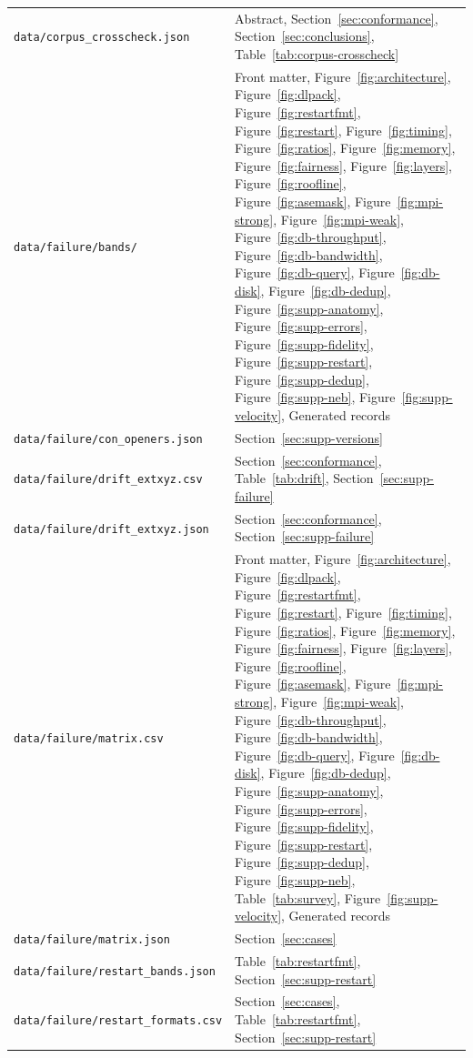 \begin{longtable}{@{}p{}p{}@{}}
\nolinkurl{data/corpus_crosscheck.json} & Abstract, Section~\ref{sec:conformance}, Section~\ref{sec:conclusions}, Table~\ref{tab:corpus-crosscheck} \\
\nolinkurl{data/failure/bands/} & Front matter, Figure~\ref{fig:architecture}, Figure~\ref{fig:dlpack}, Figure~\ref{fig:restartfmt}, Figure~\ref{fig:restart}, Figure~\ref{fig:timing}, Figure~\ref{fig:ratios}, Figure~\ref{fig:memory}, Figure~\ref{fig:fairness}, Figure~\ref{fig:layers}, Figure~\ref{fig:roofline}, Figure~\ref{fig:asemask}, Figure~\ref{fig:mpi-strong}, Figure~\ref{fig:mpi-weak}, Figure~\ref{fig:db-throughput}, Figure~\ref{fig:db-bandwidth}, Figure~\ref{fig:db-query}, Figure~\ref{fig:db-disk}, Figure~\ref{fig:db-dedup}, Figure~\ref{fig:supp-anatomy}, Figure~\ref{fig:supp-errors}, Figure~\ref{fig:supp-fidelity}, Figure~\ref{fig:supp-restart}, Figure~\ref{fig:supp-dedup}, Figure~\ref{fig:supp-neb}, Figure~\ref{fig:supp-velocity}, Generated records \\
\nolinkurl{data/failure/con_openers.json} & Section~\ref{sec:supp-versions} \\
\nolinkurl{data/failure/drift_extxyz.csv} & Section~\ref{sec:conformance}, Table~\ref{tab:drift}, Section~\ref{sec:supp-failure} \\
\nolinkurl{data/failure/drift_extxyz.json} & Section~\ref{sec:conformance}, Section~\ref{sec:supp-failure} \\
\nolinkurl{data/failure/matrix.csv} & Front matter, Figure~\ref{fig:architecture}, Figure~\ref{fig:dlpack}, Figure~\ref{fig:restartfmt}, Figure~\ref{fig:restart}, Figure~\ref{fig:timing}, Figure~\ref{fig:ratios}, Figure~\ref{fig:memory}, Figure~\ref{fig:fairness}, Figure~\ref{fig:layers}, Figure~\ref{fig:roofline}, Figure~\ref{fig:asemask}, Figure~\ref{fig:mpi-strong}, Figure~\ref{fig:mpi-weak}, Figure~\ref{fig:db-throughput}, Figure~\ref{fig:db-bandwidth}, Figure~\ref{fig:db-query}, Figure~\ref{fig:db-disk}, Figure~\ref{fig:db-dedup}, Figure~\ref{fig:supp-anatomy}, Figure~\ref{fig:supp-errors}, Figure~\ref{fig:supp-fidelity}, Figure~\ref{fig:supp-restart}, Figure~\ref{fig:supp-dedup}, Figure~\ref{fig:supp-neb}, Table~\ref{tab:survey}, Figure~\ref{fig:supp-velocity}, Generated records \\
\nolinkurl{data/failure/matrix.json} & Section~\ref{sec:cases} \\
\nolinkurl{data/failure/restart_bands.json} & Table~\ref{tab:restartfmt}, Section~\ref{sec:supp-restart} \\
\nolinkurl{data/failure/restart_formats.csv} & Section~\ref{sec:cases}, Table~\ref{tab:restartfmt}, Section~\ref{sec:supp-restart} \\

\end{longtable}
